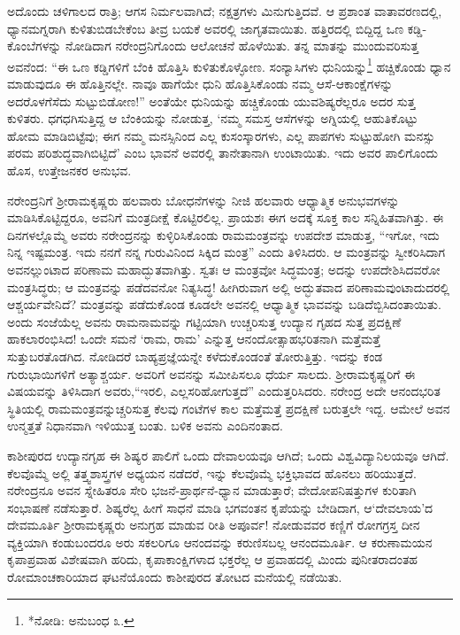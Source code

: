 ಅದೊಂದು ಚಳಿಗಾಲದ ರಾತ್ರಿ; ಆಗಸ ನಿರ್ಮಲವಾಗಿದೆ; ನಕ್ಷತ್ರಗಳು ಮಿನುಗುತ್ತಿದವೆ. ಆ ಪ್ರಶಾಂತ ವಾತಾವರಣದಲ್ಲಿ, ಧ್ಯಾನಮಗ್ನರಾಗಿ ಕುಳಿತುಬಿಡಬೇಕೆಂಬ ತೀವ್ರ ಬಯಕೆ ಅವರಲ್ಲಿ ಜಾಗೃತವಾಯಿತು. ಹತ್ತಿರದಲ್ಲಿ ಬಿದ್ದಿದ್ದ ಒಣ ಕಡ್ಡಿ-ಕೊಂಬೆಗಳನ್ನು ನೋಡಿದಾಗ ನರೇಂದ್ರನಿಗೊಂದು ಆಲೋಚನೆ ಹೊಳೆಯಿತು. ತನ್ನ ಮಾತನ್ನು ಮುಂದುವರಿಸುತ್ತ ಅವನೆಂದ: “ಈ ಒಣ ಕಡ್ಡಿಗಳಿಗೆ ಬೆಂಕಿ ಹೊತ್ತಿಸಿ ಕುಳಿತುಕೊಳ್ಳೋಣ. ಸಂನ್ಯಾಸಿಗಳು ಧುನಿಯನ್ನು\footnote{*ನೋಡಿ: ಅನುಬಂಧ ೩.} ಹಚ್ಚಿಕೊಂಡು ಧ್ಯಾನ ಮಾಡುವುದೂ ಈ ಹೊತ್ತಿನಲ್ಲೇ. ನಾವೂ ಹಾಗೆಯೇ ಧುನಿ ಹೊತ್ತಿಸಿಕೊಂಡು ನಮ್ಮ ಆಸೆ-ಆಕಾಂಕ್ಷೆಗಳನ್ನು ಅದರೊಳಗೆಸೆದು ಸುಟ್ಟುಬಿಡೋಣ!” ಅಂತೆಯೇ ಧುನಿಯನ್ನು ಹಚ್ಚಿಕೊಂಡು ಯುವಶಿಷ್ಯರೆಲ್ಲರೂ ಅದರ ಸುತ್ತ ಕುಳಿತರು. ಧಗಧಗಿಸುತ್ತಿದ್ದ ಆ ಬೆಂಕಿಯನ್ನು ನೋಡುತ್ತ, ‘ನಮ್ಮ ಸಮಸ್ತ ಆಸೆಗಳನ್ನು ಅಗ್ನಿಯಲ್ಲಿ ಆಹುತಿಕೊಟ್ಟು ಹೋಮ ಮಾಡಿಬಿಟ್ಟೆವು; ಈಗ ನಮ್ಮ ಮನಸ್ಸಿನಿಂದ ಎಲ್ಲ ಕುಸಂಸ್ಕಾರಗಳು, ಎಲ್ಲ ಪಾಪಗಳು ಸುಟ್ಟುಹೋಗಿ ಮನಸ್ಸು ಪರಮ ಪರಿಶುದ್ಧವಾಗಿಬಿಟ್ಟಿದೆ’ ಎಂಬ ಭಾವನೆ ಅವರಲ್ಲಿ ತಾನೇತಾನಾಗಿ ಉಂಟಾಯಿತು. ಇದು ಅವರ ಪಾಲಿಗೊಂದು ಹೊಸ, ಉತ್ತೇಜನಕರ ಅನುಭವ.

ನರೇಂದ್ರನಿಗೆ ಶ್ರೀರಾಮಕೃಷ್ಣರು ಹಲವಾರು ಬೋಧನೆಗಳನ್ನು ನೀಜಿ ಹಲವಾರು ಆಧ್ಯಾತ್ಮಿಕ ಅನುಭವಗಳನ್ನು ಮಾಡಿಸಿಕೊಟ್ಟಿದ್ದರೂ, ಅವನಿಗೆ ಮಂತ್ರದೀಕ್ಷೆ ಕೊಟ್ಟಿರಲಿಲ್ಲ. ಪ್ರಾಯಶಃ ಈಗ ಅದಕ್ಕೆ ಸೂಕ್ತ ಕಾಲ ಸನ್ನಿಹಿತವಾಗಿತ್ತು. ಈ ದಿನಗಳಲ್ಲೊಮ್ಮೆ ಅವರು ನರೇಂದ್ರನನ್ನು ಕುಳ್ಳಿರಿಸಿಕೊಂಡು ರಾಮಮಂತ್ರವನ್ನು ಉಪದೇಶ ಮಾಡುತ್ತ, “ಇಗೋ, ಇದು ನಿನ್ನ ಇಷ್ಟಮಂತ್ರ. ಇದು ನನಗೆ ನನ್ನ ಗುರುವಿನಿಂದ ಸಿಕ್ಕಿದ ಮಂತ್ರ” ಎಂದು ತಿಳಿಸಿದರು. ಆ ಮಂತ್ರವನ್ನು ಸ್ವೀಕರಿಸಿದಾಗ ಅವನಲ್ಲುಂಟಾದ ಪರಿಣಾಮ ಮಹಾದ್ಭುತವಾಗಿತ್ತು. ಸ್ವತಃ ಆ ಮಂತ್ರವೋ ಸಿದ್ಧಮಂತ್ರ; ಅದನ್ನು ಉಪದೇಶಿಸಿದವರೋ ಮಂತ್ರಸಿದ್ಧರು; ಆ ಮಂತ್ರವನ್ನು ಪಡೆದವನೋ ನಿತ್ಯಸಿದ್ಧ! ಹೀಗಿರುವಾಗ ಅಲ್ಲಿ ಅದ್ಭುತವಾದ ಪರಿಣಾಮವುಂಟಾದುದರಲ್ಲಿ ಆಶ್ಚರ್ಯವೇನಿದೆ? ಮಂತ್ರವನ್ನು ಪಡೆದುಕೊಂಡ ಕೂಡಲೇ ಅವನಲ್ಲಿ ಆಧ್ಯಾತ್ಮಿಕ ಭಾವವನ್ನು ಬಡಿದೆಬ್ಬಿಸಿದಂತಾಯಿತು. ಅಂದು ಸಂಜೆಯೆಲ್ಲ ಅವನು ರಾಮನಾಮವನ್ನು ಗಟ್ಟಿಯಾಗಿ ಉಚ್ಚರಿಸುತ್ತ ಉದ್ಯಾನ ಗೃಹದ ಸುತ್ತ ಪ್ರದಕ್ಷಿಣೆ ಹಾಕಲಾರಂಭಿಸಿದ! ಒಂದೇ ಸಮನೆ ‘ರಾಮ, ರಾಮ’ ಎನ್ನುತ್ತ ಆನಂದೋತ್ಸಾಹಭರಿತನಾಗಿ ಮತ್ತೆಮತ್ತೆ ಸುತ್ತುಬರತೊಡಗಿದ. ನೋಡಿದರೆ ಬಾಹ್ಯಪ್ರಜ್ಞೆಯನ್ನೇ ಕಳೆದುಕೊಂಡಂತೆ ತೋರುತ್ತಿತ್ತು. ಇದನ್ನು ಕಂಡ ಗುರುಭಾಯಿಗಳಿಗೆ ಅತ್ಯಾಶ್ಚರ್ಯ. ಅವರಿಗೆ ಅವನನ್ನು ಸಮೀಪಿಸಲೂ ಧೆರ್ಯ ಸಾಲದು. ಶ್ರೀರಾಮಕೃಷ್ಣರಿಗೆ ಈ ವಿಷಯವನ್ನು ತಿಳಿಸಿದಾಗ ಅವರು,“ಇರಲಿ, ಎಲ್ಲಸರಿಹೋಗುತ್ತದೆ” ಎಂದುತ್ತರಿಸಿದರು. ನರೇಂದ್ರ ಅದೇ ಆನಂದಭರಿತ ಸ್ಥಿತಿಯಲ್ಲಿ ರಾಮಮಂತ್ರವನ್ನುಚ್ಚರಿಸುತ್ತ ಕೆಲವು ಗಂಟೆಗಳ ಕಾಲ ಮತ್ತೆಮತ್ತೆ ಪ್ರದಕ್ಷಿಣೆ ಬರುತ್ತಲೇ ಇದ್ದ. ಆಮೇಲೆ ಅವನ ಉನ್ಮತ್ತತೆ ನಿಧಾನವಾಗಿ ಇಳಿಯುತ್ತ ಬಂತು. ಬಳಿಕ ಅವನು ಎಂದಿನಂತಾದ.

ಕಾಶೀಪುರದ ಉದ್ಯಾನಗೃಹ ಈ ಶಿಷ್ಯರ ಪಾಲಿಗೆ ಒಂದು ದೇವಾಲಯವೂ ಆಗಿದೆ; ಒಂದು ವಿಶ್ವವಿದ್ಯಾನಿಲಯವೂ ಆಗಿದೆ. ಕೆಲವೊಮ್ಮೆ ಅಲ್ಲಿ ತತ್ತ್ವಶಾಸ್ತ್ರಗಳ ಅಧ್ಯಯನ ನಡೆದರೆ, ಇನ್ನು ಕೆಲವೊಮ್ಮೆ ಭಕ್ತಿಭಾವದ ಹೊನಲು ಹರಿಯುತ್ತದೆ. ನರೇಂದ್ರನೂ ಅವನ ಸ್ನೇಹಿತರೂ ಸೇರಿ ಭಜನೆ-ಪ್ರಾರ್ಥನೆ-ಧ್ಯಾನ ಮಾಡುತ್ತಾರೆ; ವೇದೋಪನಿಷತ್ತುಗಳ ಕುರಿತಾಗಿ ಸಂಭಾಷಣೆ ನಡೆಸುತ್ತಾರೆ. ಶಿಷ್ಯರೆಲ್ಲ ಹೀಗೆ ಸಾಧನೆ ಮಾಡಿ ಭಗವಂತನ ಕೃಪೆಯನ್ನು ಬೇಡಿದಾಗ, ಆ‘ದೇವಲಾಯ’ದ ದೇವಮೂರ್ತಿ ಶ್ರೀರಾಮಕೃಷ್ಣರು ಅನುಗ್ರಹ ಮಾಡುವ ರೀತಿ ಅಪೂರ್ವ! ನೋಡುವವರ ಕಣ್ಣಿಗೆ ರೋಗಗ್ರಸ್ತ ದೀನ ವ್ಯಕ್ತಿಯಾಗಿ ಕಂಡುಬಂದರೂ ಅರು ಸಕಲರಿಗೂ ಆನಂದವನ್ನು ಕರುಣಿಸಬಲ್ಲ ಆನಂದಮೂರ್ತಿ. ಆ ಕರುಣಾಮಯನ ಕೃಪಾಪ್ರವಾಹ ವಿಶೇಷವಾಗಿ ಹರಿದು, ಕೃಪಾಕಾಂಕ್ಷಿಗಳಾದ ಭಕ್ತರೆಲ್ಲ ಆ ಪ್ರವಾಹದಲ್ಲಿ ಮಿಂದು ಪುನೀತರಾದಂತಹ ರೋಮಾಂಚಕಾರಿಯಾದ ಘಟನೆಯೊಂದು ಕಾಶೀಪುರದ ತೋಟದ ಮನೆಯಲ್ಲಿ ನಡೆಯಿತು.

